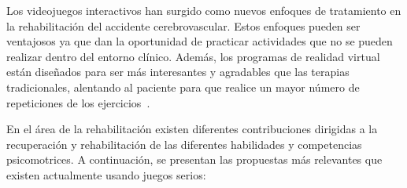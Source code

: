 Los videojuegos interactivos han surgido como nuevos enfoques de tratamiento en la rehabilitación del accidente cerebrovascular. Estos enfoques pueden ser ventajosos ya que dan la oportunidad de practicar actividades que no se pueden realizar dentro del entorno clínico. Además, los programas de realidad virtual están diseñados para ser más interesantes y agradables que las terapias tradicionales, alentando al paciente para que realice un mayor número de repeticiones de los ejercicios~\cite{laver2018virtual,alfageme2002aprendiendo}.

En el área de la rehabilitación existen diferentes contribuciones dirigidas a la recuperación y rehabilitación de las diferentes habilidades y competencias psicomotrices. A continuación, se presentan las propuestas más relevantes que existen actualmente usando juegos serios:
